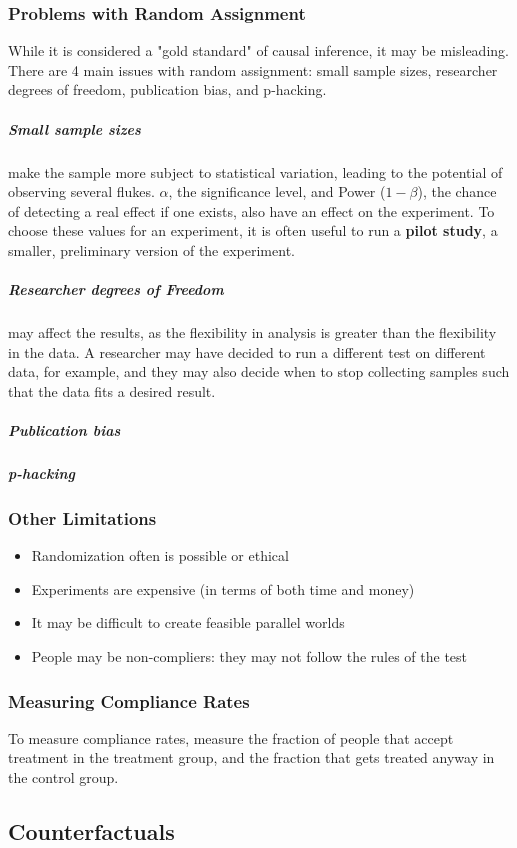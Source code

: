 \subsubsection{Problems with Random Assignment}

While it is considered a "gold standard" of causal inference, it may be misleading. There are 4 main issues with random assignment: small sample sizes, researcher degrees of freedom, publication bias, and p-hacking.
\subparagraph{Small sample sizes} make the sample more subject to statistical variation, leading to the potential of observing several flukes. $\alpha$, the significance level, and Power ($1-\beta$), the chance of detecting a real effect if one exists, also have an effect on the experiment. To choose these values for an experiment, it is often useful to run a \textbf{pilot study}, a smaller, preliminary version of the experiment.
\subparagraph{Researcher degrees of Freedom} may affect the results, as the flexibility in analysis is greater than the flexibility in the data. A researcher may have decided to run a different test on different data, for example, and they may also decide when to stop collecting samples such that the data fits a desired result.
\subparagraph{Publication bias}
\subparagraph{p-hacking}

\subsubsection{Other Limitations}
\begin{itemize}
\item Randomization often is possible or ethical
\item Experiments are expensive (in terms of both time and money)
\item It may be difficult to create feasible parallel worlds
\item People may be non-compliers: they may not follow the rules of the test
\end{itemize}

\subsubsection{Measuring Compliance Rates}
To measure compliance rates, measure the fraction of people that accept treatment in the treatment group, and the fraction that gets treated anyway in the control group.

\subsection{Counterfactuals}

